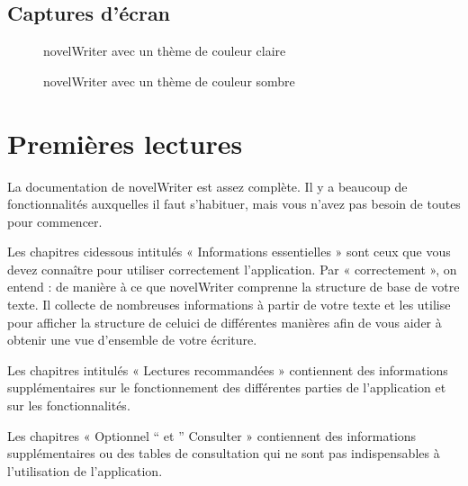 \documentclass[a4paper,11pt,french]{sphinxmanual}
\begin{document}
\section{Captures d’écran}
\label{\detokenize{int_introduction:screenshots}}\label{\detokenize{int_introduction:a-intro-screenshots}}
\begin{figure}[htbp]
\centering
\capstart

\noindent{}
\caption{novelWriter avec un thème de couleur claire}\label{\detokenize{int_introduction:id1}}\end{figure}

\begin{figure}[htbp]
\centering
\capstart

\noindent{}
\caption{novelWriter avec un thème de couleur sombre}\label{\detokenize{int_introduction:id2}}\end{figure}

\sphinxstepscope


\chapter{Premières lectures}
\label{\detokenize{int_overview:what-to-read-first}}\label{\detokenize{int_overview:a-reading}}\label{\detokenize{int_overview::doc}}
\sphinxAtStartPar
La documentation de novelWriter est assez complète. Il y a beaucoup de fonctionnalités auxquelles il faut s’habituer, mais vous n’avez pas besoin de toutes pour commencer.

\sphinxAtStartPar
Les chapitres ci\sphinxhyphen{}dessous intitulés « Informations essentielles » sont ceux que vous devez connaître pour utiliser correctement l’application. Par « correctement », on entend : de manière à ce que novelWriter comprenne la structure de base de votre texte. Il collecte de nombreuses informations à partir de votre texte et les utilise pour afficher la structure de celui\sphinxhyphen{}ci de différentes manières afin de vous aider à obtenir une vue d’ensemble de votre écriture.

\sphinxAtStartPar
Les chapitres intitulés « Lectures recommandées » contiennent des informations supplémentaires sur le fonctionnement des différentes parties de l’application et sur les fonctionnalités.

\sphinxAtStartPar
Les chapitres « Optionnel “ et ” Consulter » contiennent des informations supplémentaires ou des tables de consultation qui ne sont pas indispensables à l’utilisation de l’application.
\end{document}
